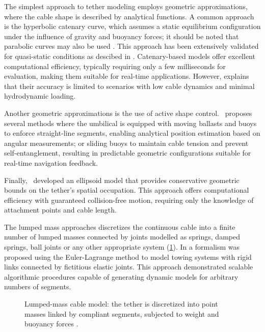 The simplest approach to tether modeling employs geometric approximations, where the cable shape is
described by analytical functions. A common approach is the hyperbolic catenary curve, which
assumes a static equilibrium configuration under the influence of gravity and buoyancy forces; it
should be noted that parabolic curves may also be used
\parencite{smolentsevShapeVisualServoing2023}. This approach has been extensively validated for
quasi-static conditions as descibed in \cite{druptValidityCatenaryModel2022,
	laranjeiraCatenarybasedVisualServoing2020}. Catenary-based models offer excellent computational
efficiency, typically requiring only a few milliseconds for evaluation, making them suitable for
real-time applications. However, \cite{filliungAugmentedCatenaryModel2024} explains that their
accuracy is limited to scenarios with low cable dynamics and minimal hydrodynamic loading.

Another geometric approximations is the use of active shape
control.~\cite{vielROVLocalizationBased2023,vielSelfManagementROVUmbilical2022} proposes several
methods where the umbilical is equipped with moving ballasts and buoys to enforce straight-line
segments, enabling analytical position estimation based on angular measurements; or sliding buoys
to maintain cable tension and prevent self-entanglement, resulting in predictable geometric
configurations suitable for real-time navigation feedback.

Finally,~\cite{vielEllipsoidTetherModel2024} developed an ellipsoid model that provides
conservative geometric bounds on the tether's spatial occupation. This approach offers
computational efficiency with guaranteed collision-free motion, requiring only the knowledge of
attachment points and cable length.

The lumped mass approaches discretizes the continuous cable into a finite number of lumped masses
connected by joints modelled as springs, damped springs, ball joints or any other appropriate
system (\cref{sota_sm_tm_lumped_mass}). In \cite{dasilvagomesNewDynamicModel2021} a formalism was
proposed using the Euler-Lagrange method to model towing systems with rigid links connected by
fictitious elastic joints. This approach demonstrated scalable algorithmic procedures capable of
generating dynamic models for arbitrary numbers of segments.

\begin{figure}
	\centering
	\caption{
		Lumped-mass cable model: the tether is discretized into point masses  linked by
		compliant segments, subjected to weight and buoyancy forces \parencite{hallValidationLumpedmassMooring2015, hongDynamicsModelingMotion2020}.
	}
	\label{sota_sm_tm_lumped_mass}
\end{figure}

